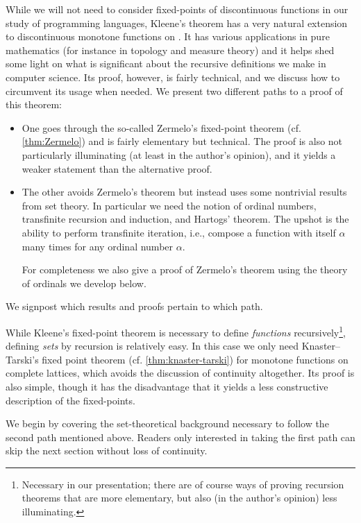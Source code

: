 While we will not need to consider fixed-points of discontinuous functions in our study of programming languages, Kleene's theorem has a very natural extension to discontinuous monotone functions on \dCPOpl. It has various applications in pure mathematics (for instance in topology and measure theory) and it helps shed some light on what is significant about the recursive definitions we make in computer science. Its proof, however, is fairly technical, and we discuss how to circumvent its usage when needed. We present two different paths to a proof of this theorem:
%
\begin{itemize}
    \item One goes through the so-called Zermelo's fixed-point theorem (cf. \cref{thm:Zermelo}) and is fairly elementary but technical. The proof is also not particularly illuminating (at least in the author's opinion), and it yields a weaker statement than the alternative proof.

    \item The other avoids Zermelo's theorem but instead uses some nontrivial results from set theory. In particular we need the notion of ordinal numbers, transfinite recursion and induction, and Hartogs' theorem. The upshot is the ability to perform transfinite iteration, i.e., compose a function with itself $\alpha$ many times for any ordinal number $\alpha$.

    For completeness we also give a proof of Zermelo's theorem using the theory of ordinals we develop below.
\end{itemize}
%
We signpost which results and proofs pertain to which path.

While Kleene's fixed-point theorem is necessary to define \emph{functions} recursively\footnote{Necessary in our presentation; there are of course ways of proving recursion theorems that are more elementary, but also (in the author's opinion) less illuminating.}, defining \emph{sets} by recursion is relatively easy. In this case we only need Knaster--Tarski's fixed point theorem (cf. \cref{thm:knaster-tarski}) for monotone functions on complete lattices, which avoids the discussion of continuity altogether. Its proof is also simple, though it has the disadvantage that it yields a less constructive description of the fixed-points.

We begin by covering the set-theoretical background necessary to follow the second path mentioned above. Readers only interested in taking the first path can skip the next section without loss of continuity.


